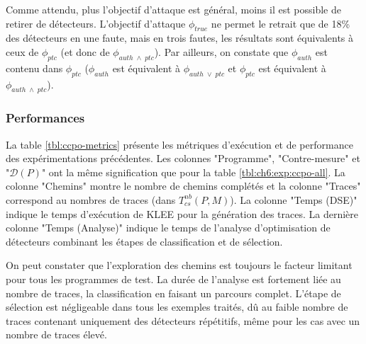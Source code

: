                 Comme attendu, plus l'objectif d'attaque est général, moins il est possible de retirer de détecteurs.
                L'objectif d'attaque $\phi_{true}$ ne permet le retrait que de 18\% des détecteurs en une faute, mais en trois fautes, les résultats sont équivalents à ceux de $\phi_{ptc}$ (et donc de $\phi_{auth\; \wedge \;ptc}$).
                Par ailleurs, on constate que $\phi_{auth}$ est contenu dans $\phi_{ptc}$ ($\phi_{auth}$ est équivalent à $\phi_{auth\; \vee \;ptc}$ et $\phi_{ptc}$ est équivalent à $\phi_{auth\; \wedge \;ptc}$).
  
            \subsubsection{Performances}
            \label{sec:ch6:exp:perf}
        
                La table \ref{tbl:ccpo-metrics} présente les métriques d'exécution et de performance des expérimentations précédentes.
                Les colonnes "Programme", "Contre-mesure" et "$\mathcal{D}(P)$" ont la même signification que pour la table \ref{tbl:ch6:exp:ccpo-all}. 
                La colonne "Chemins" montre le nombre de chemins complétés et la colonne "Traces" correspond au nombres de traces (dans $T_{cs}^{nb}(P, M)$).
                La colonne "Temps (DSE)" indique le temps d'exécution de KLEE pour la génération des traces. 
                La dernière colonne "Temps (Analyse)" indique le temps de l'analyse d'optimisation de détecteurs combinant les étapes de classification et de sélection.
        
                On peut constater que l'exploration des chemins est toujours le facteur limitant pour tous les programmes de test.
                La durée de l'analyse est fortement liée au nombre de traces, la classification en faisant un parcours complet.
                L'étape de sélection est négligeable dans tous les exemples traités, dû au faible nombre de traces contenant uniquement des détecteurs répétitifs, même pour les cas avec un nombre de traces élevé.

